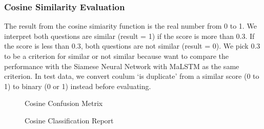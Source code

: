 \documentclass[12pt,oneside,openright,a4paper]{cpe-english-project}
\begin{document}
\subsubsection{Cosine Similarity Evaluation}
The result from the cosine simiarity function is the real number from 0 to 1. We interpret both questions are similar (result = 1) if the  score is more than 0.3. If the score is less than 0.3, both questions are not similar (result = 0). We pick 0.3 to be a criterion for similar or not similar because want to compare the performance with the Siamese Neural Network with MaLSTM as the same criterion. In test data, we convert coulum ‘is duplicate’ from a similar score (0 to 1)  to binary (0 or 1) instead before evaluating.
\begin{figure}[!h]\centering
{}
\caption{Cosine Confusion Metrix}\label{fig:Cosine Confusion Metrix}
\end{figure} 
\begin{figure}[!h]\centering
{}
\caption{Cosine Classification Report}\label{fig:Cosine Classification Report}
\end{figure} 
\pagebreak
\end{document}
